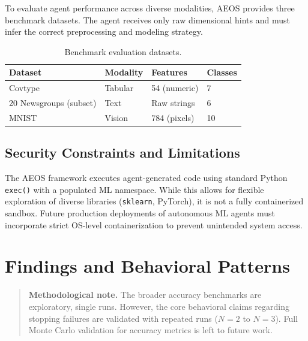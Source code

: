 \documentclass[11pt]{article}
\begin{document}
To evaluate agent performance across diverse modalities, AEOS provides three benchmark datasets. The agent receives only raw dimensional hints and must infer the correct preprocessing and modeling strategy.

\begin{table}[H]
  \centering
  \caption{Benchmark evaluation datasets.}
  \label{tab:datasets}
  \small
  \begin{tabular}{@{}llll@{}}
    \toprule
    \textbf{Dataset} & \textbf{Modality} & \textbf{Features} & \textbf{Classes} \\
    \midrule
    Covtype & Tabular & 54 (numeric) & 7 \\
    20 Newsgroups (subset) & Text & Raw strings & 6 \\
    MNIST & Vision & 784 (pixels) & 10 \\
    \bottomrule
  \end{tabular}
\end{table}

\subsection{Security Constraints and Limitations}

The AEOS framework executes agent-generated code using standard Python \texttt{exec()} with a populated ML namespace. While this allows for flexible exploration of diverse libraries (\texttt{sklearn}, PyTorch), it is not a fully containerized sandbox. Future production deployments of autonomous ML agents must incorporate strict OS-level containerization to prevent unintended system access.

\section{Findings and Behavioral Patterns}
\label{sec:findings}

\begin{quote}
\textbf{Methodological note.} The broader accuracy benchmarks are exploratory, single runs. However, the core behavioral claims regarding stopping failures are validated with repeated runs ($N=2$ to $N=3$). Full Monte Carlo validation for accuracy metrics is left to future work.
\end{quote}
\end{document}
